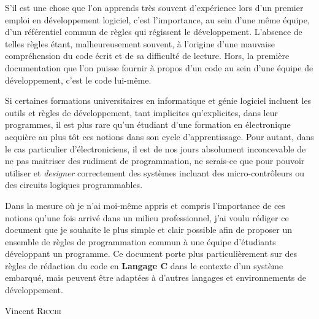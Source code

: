 
S'il est une chose que l'on apprends très souvent d'expérience lors d'un premier emploi en développement logiciel, c'est l'importance, au sein d'une même équipe, d'un référentiel commun de règles qui régissent le développement. L'absence de telles règles étant, malheureusement souvent, à l'origine d'une mauvaise compréhension du code écrit et de sa difficulté de lecture. Hors, la première documentation que l'on puisse fournir à propos d'un code au sein d'une équipe de développement, c'est le code lui-même.\bigskip

Si certaines formations universitaires en informatique et génie logiciel incluent les outils et règles de développement, tant implicites qu'explicites, dans leur programmes, il est plus rare qu'un étudiant d'une formation en électronique acquière au plus tôt ces notions dans son cycle d'apprentissage. Pour autant, dans le cas particulier d'électroniciens, il est de nos jours absolument inconcevable de ne pas maitriser des rudiment de programmation, ne serais-ce que pour pouvoir utiliser et \textit{designer} correctement des systèmes incluant des micro-contrôleurs ou des circuits logiques programmables.\bigskip

Dans la mesure où je n'ai moi-même appris et compris l'importance de ces notions qu'une fois arrivé dans un milieu professionnel, j'ai voulu rédiger ce document que je souhaite le plus simple et clair possible afin de proposer un ensemble de règles de programmation commun à une équipe d'étudiants développant un programme. Ce document porte plus particulièrement sur des règles de rédaction du code en \textbf{Langage C} dans le contexte d'un système embarqué, mais peuvent être adaptées à d'autres langages et environnements de développement.\bigskip

\begin{flushright}
Vincent \textsc{Ricchi}
\end{flushright}

\pagebreak